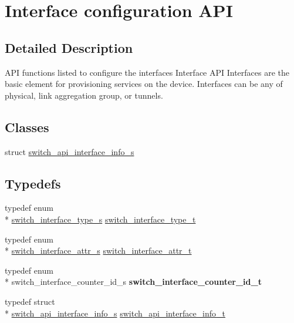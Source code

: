 \hypertarget{group__Interface}{\section{Interface configuration A\+P\+I}
\label{group__Interface}
}


\subsection{Detailed Description}
A\+P\+I functions listed to configure the interfaces Interface A\+P\+I Interfaces are the basic element for provisioning services on the device. Interfaces can be any of physical, link aggregation group, or tunnels. \subsection*{Classes}
\begin{DoxyCompactItemize}
\item 
struct \hyperlink{structswitch__api__interface__info__s}{switch\+\_\+api\+\_\+interface\+\_\+info\+\_\+s}
\end{DoxyCompactItemize}
\subsection*{Typedefs}
\begin{DoxyCompactItemize}
\item 
typedef enum \\*
\hyperlink{group__Interface_ga641df0985dd7cb34a4f81a6939475b32}{switch\+\_\+interface\+\_\+type\+\_\+s} \hyperlink{group__Interface_ga6052d8868148cccd877ca7b8dc42e778}{switch\+\_\+interface\+\_\+type\+\_\+t}
\item 
typedef enum \\*
\hyperlink{group__Interface_ga6fbf969f945ba342e8203504371e92c2}{switch\+\_\+interface\+\_\+attr\+\_\+s} \hyperlink{group__Interface_gae3f7852efe077668aac3bd04e29d7e4a}{switch\+\_\+interface\+\_\+attr\+\_\+t}
\item 
\hypertarget{group__Interface_gab8dd60af634c603f758cc9ad329ab037}{typedef enum \\*
switch\+\_\+interface\+\_\+counter\+\_\+id\+\_\+s {\bfseries switch\+\_\+interface\+\_\+counter\+\_\+id\+\_\+t}}\label{group__Interface_gab8dd60af634c603f758cc9ad329ab037}

\item 
typedef struct \\*
\hyperlink{structswitch__api__interface__info__s}{switch\+\_\+api\+\_\+interface\+\_\+info\+\_\+s} \hyperlink{group__Interface_gac12fe27937cc35580197d25bf616c5d3}{switch\+\_\+api\+\_\+interface\+\_\+info\+\_\+t}
\end{DoxyCompactItemize}
